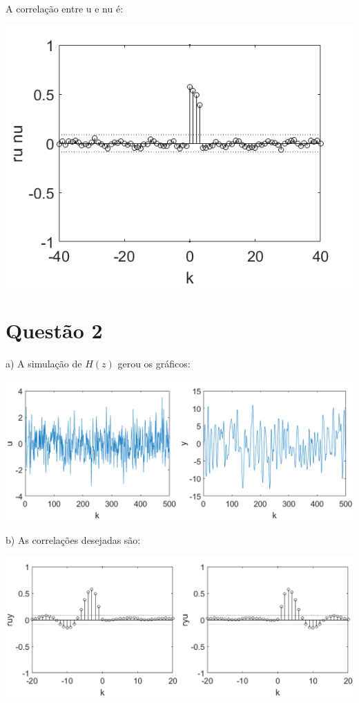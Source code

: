 \documentclass{rbfin}
\begin{document}
\newpage

A correlação entre u e nu é:

\begin{center}
\includegraphics[scale=0.666]{1runu}
\end{center}

\section*{Questão 2}

a) A simulação de $H(z)$ gerou os gráficos:

\begin{center}
\includegraphics[scale=0.65]{2a}
\end{center}

\newpage

b) As correlações desejadas são:

\begin{center}
\includegraphics[scale=0.65]{2b}
\end{center}
\end{document}
